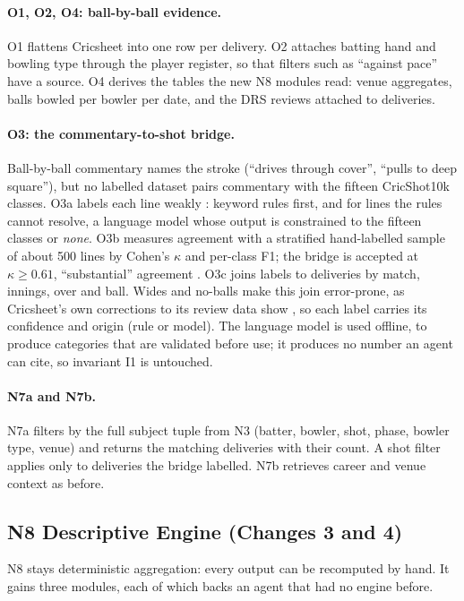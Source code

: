 \documentclass[11pt,a4paper]{article}
\begin{document}
\paragraph{O1, O2, O4: ball-by-ball evidence.} O1 flattens Cricsheet into one
row per delivery. O2 attaches batting hand and bowling type through the player
register, so that filters such as ``against pace'' have a source. O4 derives the
tables the new N8 modules read: venue aggregates, balls bowled per bowler per
date, and the DRS reviews attached to deliveries.

\paragraph{O3: the commentary-to-shot bridge.} Ball-by-ball commentary names the
stroke (``drives through cover'', ``pulls to deep square''), but no labelled
dataset pairs commentary with the fifteen CricShot10k classes. O3a labels each
line weakly \cite{snorkel}: keyword rules first, and for lines the rules cannot
resolve, a language model whose output is constrained to the fifteen classes or
\emph{none}. O3b measures agreement with a stratified hand-labelled sample of
about 500 lines by Cohen's $\kappa$ \cite{cohen} and per-class F1; the bridge is
accepted at $\kappa \geq 0.61$, ``substantial'' agreement \cite{landis}. O3c joins
labels to deliveries by match, innings, over and ball. Wides and no-balls make
this join error-prone, as Cricsheet's own corrections to its review data show
\cite{cricsheetreview}, so each label carries its confidence and origin (rule or
model). The language model is used offline, to produce categories that are
validated before use; it produces no number an agent can cite, so invariant I1
is untouched.

\paragraph{N7a and N7b.} N7a filters by the full subject tuple from N3 (batter,
bowler, shot, phase, bowler type, venue) and returns the matching deliveries
with their count. A shot filter applies only to deliveries the bridge labelled.
N7b retrieves career and venue context as before.

\subsection{N8 Descriptive Engine (Changes 3 and 4)}

N8 stays deterministic aggregation: every output can be recomputed by hand. It
gains three modules, each of which backs an agent that had no engine before.
\end{document}
